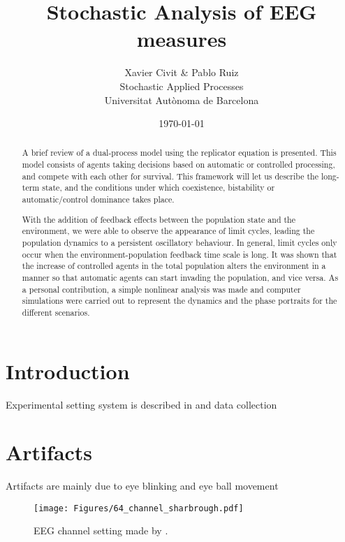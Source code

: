 \documentclass[10pt,a4paper]{article}
\title{Stochastic Analysis of EEG measures}
\author{
        \small{Xavier Civit \& Pablo Ruiz} \\
         \small{Stochastic Applied Processes}\\
                \small{Universitat Autònoma de Barcelona}
}
\date{\today}
\begin{document}
\maketitle

\begin{abstract}
A brief review of a dual-process model using the replicator equation is presented. This model consists of agents taking decisions based on 
automatic or controlled processing, and compete with each other for survival. This framework will let us describe the long-term state, and 
the conditions under which coexistence, bistability or automatic/control dominance takes place.

With the addition of feedback effects
between the population state and the environment, we were able to observe the appearance of limit cycles, leading the population dynamics
to a persistent oscillatory behaviour. In general, limit cycles only occur when the environment-population feedback time scale is long. It was shown that
the increase of controlled agents in the total population alters the environment in a manner so that automatic agents can start invading the population, and
vice versa. As a personal contribution, a simple nonlinear analysis was made and computer simulations were carried out to represent the dynamics and 
the phase portraits for the different scenarios.
\end{abstract}

\tableofcontents

\section{Introduction}

Experimental setting system is described in \cite{Experiment:BCI2000} and data collection

\section{Artifacts}

Artifacts are mainly due to eye blinking and eye ball movement \cite{EEG:artifacts}

\begin{figure}[h!]
\centering
\vspace{-2cm}
\texttt{[image: Figures/64\_channel\_sharbrough.pdf]}
\vspace{-2cm}
\caption{EEG channel setting made by \cite{Experiment:BCI2000}.}
\label{fig:fitness}
\end{figure}
\end{document}
